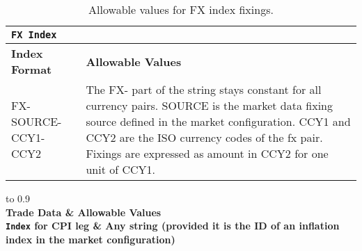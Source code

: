 \begin{table}[H]
\centering
\begin{tabular}{|l|p{10cm}|}
\hline
\multicolumn{2}{|l|}{\tt FX Index}   \\ \hline
\textbf{Index Format} &\textbf{Allowable Values}     \\ \hline
FX-SOURCE-CCY1-CCY2    &    
The FX- part of the string stays constant for all currency pairs. SOURCE is the market data fixing source defined in the market configuration. CCY1 and CCY2 are the ISO currency codes of the fx pair. Fixings are expressed as amount in CCY2 for one unit of CCY1.\\ \hline
\end{tabular}
  \caption{Allowable values for FX index fixings.}
  \label{tab:fxindex_data}
\end{table}

\begin{table}[H]
\centering
  \begin{tabu} to 0.9\linewidth {| X[-1.5,l,m] | X[-5,l,m] |}
    \hline
     \\ \hline
    \bfseries{Trade Data} & \bfseries{Allowable Values} \\
    \hline
    \lstinline!Index! for CPI leg & Any string (provided it is the ID of an inflation index in the market configuration) \\
    \hline
  \end{tabu}
  \caption{Allowable values for CPI index.}
  \label{tab:cpiindex_data}
\end{table}

